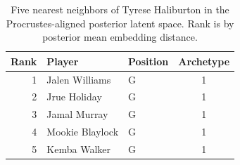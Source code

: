 \begin{table}[htbp]
  \centering\small
  \begin{tabular}{rllc}
    \toprule
    Rank & Player & Position & Archetype \\
    \midrule
    1 & Jalen Williams & G & 1 \\
    2 & Jrue Holiday & G & 1 \\
    3 & Jamal Murray & G & 1 \\
    4 & Mookie Blaylock & G & 1 \\
    5 & Kemba Walker & G & 1 \\
    \bottomrule
  \end{tabular}
  \caption{Five nearest neighbors of Tyrese Haliburton in the Procrustes-aligned posterior latent space. Rank is by posterior mean embedding distance.}
  \label{tab:Tyrese_Haliburton_neighbors}
\end{table}

